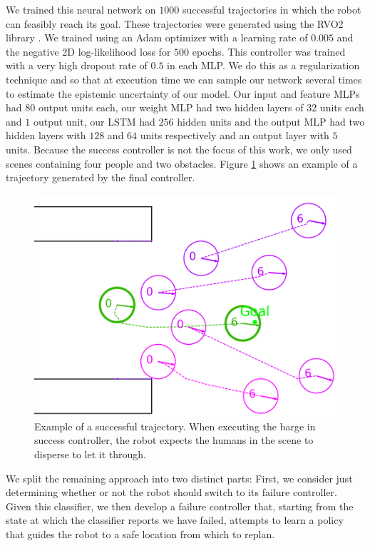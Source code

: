 \documentclass[letterpaper, 10 pt, conference]{ieeeconf}  %
\begin{document}
	We trained this neural network on $1000$ successful trajectories in which the robot can feasibly reach its goal. These trajectories were generated using the RVO2 library \cite{rvo2}\cite{pyrvo2}. We trained using an Adam optimizer with a learning rate of $0.005$ and the negative 2D log-likelihood loss for $500$ epochs. This controller was trained with a very high dropout rate of $0.5$ in each MLP. We do this as a regularization technique and so that at execution time we can sample our network several times to estimate the epistemic uncertainty of our model. Our input and feature MLPs had $80$ output units each, our weight MLP had two hidden layers of $32$ units each and $1$ output unit, our LSTM had $256$ hidden units and the output MLP had two hidden layers with $128$ and $64$ units respectively and an output layer with $5$ units. Because the success controller is not the focus of this work, we only used scenes containing four people and two obstacles. Figure \ref{fig:success} shows an example of a trajectory generated by the final controller. 

	\begin{figure}
		\centering
		\includegraphics[width=\linewidth]{success_without_ellipses}
		\caption{Example of a successful trajectory. When executing the barge in success controller, the robot expects the humans in the scene to disperse to let it through.}
		\label{fig:success}
	\end{figure}
	
	We split the remaining approach into two distinct parts: First, we consider just determining whether or not the robot should switch to its failure controller. Given this classifier, we then develop a failure controller that, starting from the state at which the classifier reports we have failed, attempts to learn a policy that guides the robot to a safe location from which to replan.
	
\end{document}

